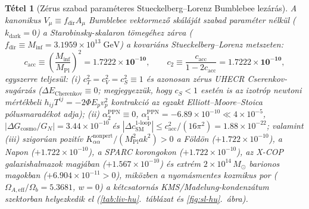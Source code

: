 \documentclass[11pt,a4paper]{article}
\newtheorem{theorem}{Tétel}[section]
\begin{document}
\begin{theorem}[Zérus szabad paraméteres Stueckelberg--Lorenz Bumblebee lezárás]
\label{thm:director-closure}
A kanonikus $V_\mu \equiv f_{\mathrm{dir}} A_\mu$ Bumblebee vektormező skáláját szabad paraméter nélkül ($k_{\mathrm{dark}} = 0$) a Starobinsky-skalaron tömegéhez zárva ($f_{\mathrm{dir}} \equiv M_{\mathrm{inf}} = 3.1959\times 10^{13}\;\mathrm{GeV}$) a kovariáns Stueckelberg--Lorenz metszeten:
\begin{equation}
c_{\mathrm{acc}} \equiv \left(\frac{M_{\mathrm{inf}}}{M_{\mathrm{Pl}}}\right)^{\!2} = \mathbf{1.7222\times 10^{-10}}, \qquad
c_2 \equiv \frac{c_{\mathrm{acc}}}{1 - 2 c_{\mathrm{acc}}} = \mathbf{1.7222\times 10^{-10}},
\end{equation}
egyszerre teljesül: (i) $c_T^2 = c_V^2 = c_S^2 \equiv 1$ és azonosan zérus UHECR Cserenkov-sugárzás ($\Delta E_{\mathrm{Cherenkov}} \equiv 0$; megjegyezzük, hogy $c_S < 1$ esetén is az izotróp newtoni mértékbeli $h_{ij}T^{ij} = -2\Phi E_p v_p^2$ kontrakció az egzakt Elliott--Moore--Stoica pólusmaradékot \cite{ElliottMooreStoica2005} adja); (ii) $\alpha_2^{\mathrm{PPN}} \equiv 0$, $\alpha_1^{\mathrm{PPN}} = -6.89\times 10^{-10} \ll 4\times 10^{-5}$, $|\Delta G_{\mathrm{cosmo}}/G_N| = 3.44\times 10^{-10}$ és $|\Delta c_{\mathrm{SM}}^{\text{1-loop}}| \le c_{\mathrm{acc}}^2/(16\pi^2) = 1.88\times 10^{-22}$; valamint (iii) szigorúan pozitív $K_{\alpha\alpha}^{\mathrm{nonpert}}/(M_{\mathrm{Pl}}^2 a k^2) > 0$ a Földön ($+1.722\times 10^{-10}$), a Napon ($+1.722\times 10^{-10}$), a SPARC korongokon ($+1.722\times 10^{-10}$), az X-COP galaxishalmazok magjában ($+1.567\times 10^{-10}$) és extrém $2\times 10^{14}\,M_\odot$ barionos magokban ($+6.904\times 10^{-11} > 0$), miközben a nyomásmentes kozmikus por ($\Omega_{A,\mathrm{eff}}/\Omega_b = 5.3681$, $w=0$) a kétcsatornás KMS/Madelung-kondenzátum szektorban helyezkedik el (\ref{tab:liv-hu}.\ táblázat és \ref{fig:sl-hu}.\ ábra).
\end{theorem}
\end{document}

